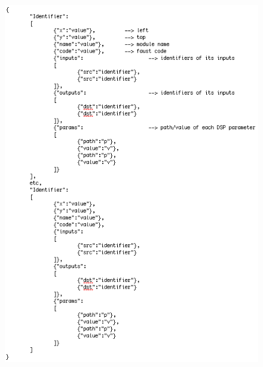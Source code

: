 \documentclass[a4paper]{article}
\begin{document}
\begin{figure}[!h]
\begin{center}
\includegraphics[width=\columnwidth]{images/JSON.png}
\label{fig:JSON}
\end{center}
\end{figure}
\end{document}
